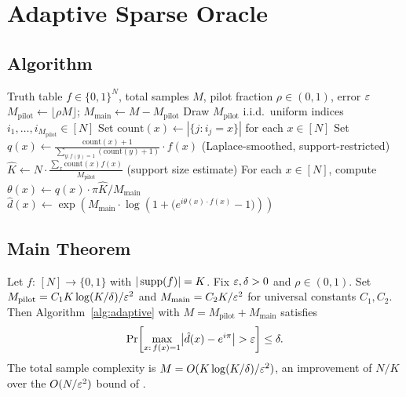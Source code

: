 \section{Adaptive Sparse Oracle}
\label{sec:adaptive}

\subsection{Algorithm}

\begin{algorithm}[H]
\caption{Adaptive Oracle Sketch for $K$-Sparse $f$}
\label{alg:adaptive}
\begin{algorithmic}[1]
\Require Truth table $f\in\{0,1\}^N$, total samples $M$, pilot fraction $\rho\in(0,1)$, error $\varepsilon$
\State $M_{\mathrm{pilot}} \leftarrow \lfloor\rho M\rfloor$; $M_{\mathrm{main}} \leftarrow M - M_{\mathrm{pilot}}$
\State Draw $M_{\mathrm{pilot}}$ i.i.d.\ uniform indices $i_1,\ldots,i_{M_{\mathrm{pilot}}}\in[N]$
\State Set $\mathrm{count}(x) \leftarrow |\{j: i_j = x\}|$ for each $x\in[N]$
\State Set $q(x) \leftarrow \frac{\mathrm{count}(x)+1}{\sum_{y:f(y)=1}(\mathrm{count}(y)+1)}\cdot f(x)$ \quad (Laplace-smoothed, support-restricted)
\State $\hat{K} \leftarrow N\cdot \frac{\sum_{x}\mathrm{count}(x)f(x)}{M_{\mathrm{pilot}}}$ \quad (support size estimate)
\State For each $x\in[N]$, compute $\theta(x) \leftarrow q(x)\cdot\pi\hat{K}/M_{\mathrm{main}}$
\State \Return $\hat{d}(x) \leftarrow \exp\!\left(M_{\mathrm{main}}\cdot\log\!\left(1 + \bigl(e^{i\theta(x)\cdot f(x)} - 1\bigr)\right)\right)$
\end{algorithmic}
\end{algorithm}

\subsection{Main Theorem}

\begin{theorem}\label{thm:adaptive}
Let $f:\,[N]\to\{0,1\}$ with $|\operatorname{supp}(f)| = K$.  Fix $\varepsilon,\delta > 0$ and $\rho\in(0,1)$.  Set $M_{\mathrm{pilot}} = C_1 K\log(K/\delta)/\varepsilon^2$ and $M_{\mathrm{main}} = C_2 K/\varepsilon^2$ for universal constants $C_1, C_2$.  Then Algorithm~\ref{alg:adaptive} with $M = M_{\mathrm{pilot}} + M_{\mathrm{main}}$ satisfies
\[
  \Pr\!\left[\max_{x:\,f(x)=1}\bigl|\hat{d}(x) - e^{i\pi}\bigr| > \varepsilon\right] \leq \delta.
\]
The total sample complexity is $M = O(K\log(K/\delta)/\varepsilon^2)$, an improvement of $N/K$ over the $O(N/\varepsilon^2)$ bound of \Zhao.
\end{theorem}

